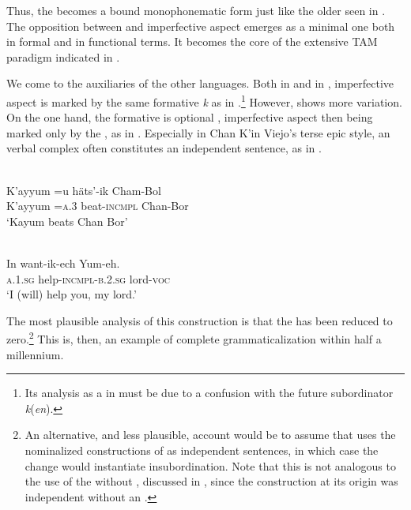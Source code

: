 \documentclass[output=paper]{langsci/langscibook}
\begin{document}
Thus, the   becomes a bound monophonematic form just like the older   seen in . The opposition between  and imperfective aspect emerges as a minimal one both in formal and in functional terms. It becomes the core of the extensive TAM  paradigm indicated in .



We come to the  auxiliaries of the other  languages. Both in  and in , imperfective aspect is marked by the same formative \textit{k} as in .\footnote{Its analysis as a  in \citet[61]{Bruce1968} must be due to a confusion with the future subordinator \textit{k}(\textit{en}).} However,  shows more variation. On the one hand, the formative is optional \citep[62]{Bruce1968}, imperfective aspect then being marked only by the  , as in . Especially in Chan K’in Viejo’s terse epic style, an  verbal complex often constitutes an independent sentence, as in .


\ea\label{ex:lehmann:32}
\\
  \gll    K’ayyum  =u    häts’-ik      Cham-Bol\\
   K’ayyum    =\textsc{a.3}    beat-\textsc{incmpl}    Chan-Bor\\
\glt ‘Kayum beats Chan Bor’ \citep[105]{Bruce1968}
\z


\ea\label{ex:lehmann:33}
\\
  \gll    In      want-ik-ech      Yum-eh.\\
   \textsc{a.1.sg}  help-\textsc{incmpl-b.2.sg}  lord-\textsc{voc}\\
\glt ‘I (will) help you, my lord.’ \citep[26]{Bruce1974}
\z



The most plausible analysis of this construction is that the  has been reduced to zero.\footnote{An alternative, and less plausible, account would be to assume that  uses the nominalized constructions of  as independent sentences, in which case the change would instantiate insubordination. Note that this is not analogous to the  use of the  without , discussed in  , since the  construction at its origin was independent without an .} This is, then, an example of complete grammaticalization within half a millennium.
\end{document}

